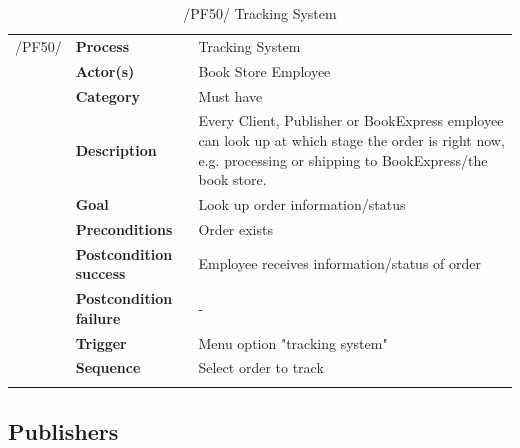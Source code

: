 \documentclass[11pt,a4paper,oneside,svgnames]{report}
\begin{document}
\begin{table}[H]
\centering
\begin{tabular}{p{1.5cm}p{3cm}p{8cm}}
\cellcolor{white}/PF50/	& \textbf{Process} & Tracking System\\
\cellcolor{white}		& \textbf{Actor(s)} & Book Store Employee\\
\cellcolor{white}		& \textbf{Category} & Must have\\
\cellcolor{white}		& \textbf{Description}	 & Every Client, Publisher or BookExpress employee can look up at which stage the order is right now, e.g. processing or shipping to BookExpress/the book store.\\
\cellcolor{white}		& \textbf{Goal} & Look up order information/status\\
\cellcolor{white}		& \textbf{Preconditions} & Order exists\\
\cellcolor{white}		& \textbf{Postcondition success} & Employee receives information/status of order\\
\cellcolor{white}		& \textbf{Postcondition failure} & -\\
\cellcolor{white}		& \textbf{Trigger} & Menu option "tracking system"\\
\cellcolor{white}		& \textbf{Sequence} & Select order to track\\
\cellcolor{white}\hfill \\
\end{tabular}
\caption{/PF50/ Tracking System}
\label{tab:pf50}
\end{table}


\subsection{Publishers}
\end{document}
